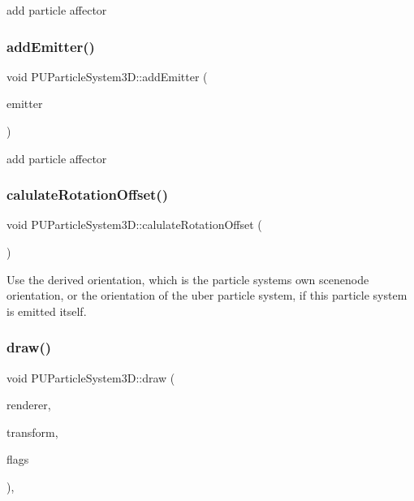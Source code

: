 add particle affector \mbox{\label{classPUParticleSystem3D_aa317775b911d27623d6b7f61733f6a32}} 
\subsubsection{\texorpdfstring{add\+Emitter()}{addEmitter()}\hspace{0.1cm}{\footnotesize\ttfamily [2/2]}}
{\footnotesize\ttfamily void P\+U\+Particle\+System3\+D\+::add\+Emitter (\begin{DoxyParamCaption}\item[{\hyperlink{classPUEmitter}{P\+U\+Emitter} $\ast$}]{emitter }\end{DoxyParamCaption})}

add particle affector \mbox{\label{classPUParticleSystem3D_a399e6e4c5e54c5ec87cb1d38f7d254af}} 
\subsubsection{\texorpdfstring{calulate\+Rotation\+Offset()}{calulateRotationOffset()}}
{\footnotesize\ttfamily void P\+U\+Particle\+System3\+D\+::calulate\+Rotation\+Offset (\begin{DoxyParamCaption}\item[{void}]{ }\end{DoxyParamCaption})}

Use the derived orientation, which is the particle systems\textquotesingle{} own scenenode orientation, or the orientation of the uber particle system, if this particle system is emitted itself.\mbox{\label{classPUParticleSystem3D_ac4ab268d41e408ba4c2636827717cf48}} 
\subsubsection{\texorpdfstring{draw()}{draw()}\hspace{0.1cm}{\footnotesize\ttfamily [1/2]}}
{\footnotesize\ttfamily void P\+U\+Particle\+System3\+D\+::draw (\begin{DoxyParamCaption}\item[{\hyperlink{classRenderer}{Renderer} $\ast$}]{renderer,  }\item[{const \hyperlink{classMat4}{Mat4} \&}]{transform,  }\item[{uint32\+\_\+t}]{flags }\end{DoxyParamCaption})\hspace{0.3cm}{\ttfamily [override]}, {\ttfamily [virtual]}}

